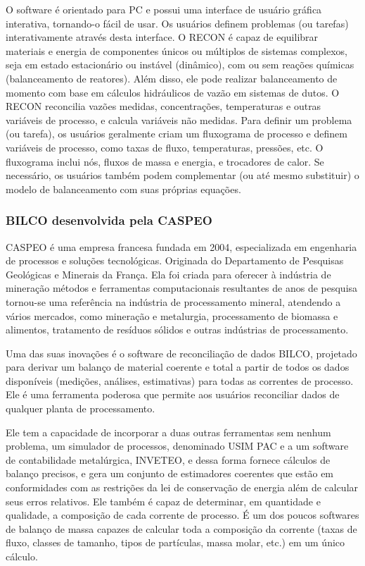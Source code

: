 O software é orientado para PC e possui uma interface de usuário gráfica interativa, tornando-o fácil de usar. Os usuários definem problemas (ou tarefas) interativamente através desta interface. O RECON é capaz de equilibrar materiais e energia de componentes únicos ou múltiplos de sistemas complexos, seja em estado estacionário ou instável (dinâmico), com ou sem reações químicas (balanceamento de reatores). Além disso, ele pode realizar balanceamento de momento com base em cálculos hidráulicos de vazão em sistemas de dutos. O RECON reconcilia vazões medidas, concentrações, temperaturas e outras variáveis de processo, e calcula variáveis não medidas. Para definir um problema (ou tarefa), os usuários geralmente criam um fluxograma de processo e definem variáveis de processo, como taxas de fluxo, temperaturas, pressões, etc. O fluxograma inclui nós, fluxos de massa e energia, e trocadores de calor. Se necessário, os usuários também podem complementar (ou até mesmo substituir) o modelo de balanceamento com suas próprias equações.

\subsubsection{BILCO desenvolvida pela CASPEO}

CASPEO é uma empresa francesa fundada em 2004, especializada em engenharia de processos e soluções tecnológicas. Originada do 
Departamento de Pesquisas Geológicas e Minerais da França. Ela foi criada para oferecer à indústria de mineração métodos e ferramentas computacionais resultantes de anos de pesquisa tornou-se uma referência na indústria de processamento mineral, atendendo a vários mercados, como mineração e metalurgia, processamento de biomassa e alimentos, tratamento de resíduos sólidos e outras indústrias de processamento. 

Uma das suas inovações é o software de reconciliação de dados BILCO, projetado para derivar um balanço de material coerente e total a partir de todos os dados disponíveis (medições, análises, estimativas) para todas as correntes de processo. Ele é uma ferramenta poderosa que permite aos usuários reconciliar dados de qualquer planta de processamento.

Ele tem a capacidade de incorporar a duas outras ferramentas sem nenhum problema, um simulador de processos, denominado USIM PAC e a um software de contabilidade metalúrgica, INVETEO, e dessa forma fornece cálculos de balanço precisos, e gera um conjunto de estimadores coerentes que estão em conformidades com as restrições da lei de conservação de energia além de calcular seus erros relativos. Ele também é capaz de determinar, em quantidade e qualidade, a composição de cada corrente de processo. É um dos poucos softwares de balanço de massa capazes de calcular toda a composição da corrente (taxas de fluxo, classes de tamanho, tipos de partículas, massa molar, etc.) em um único cálculo.

